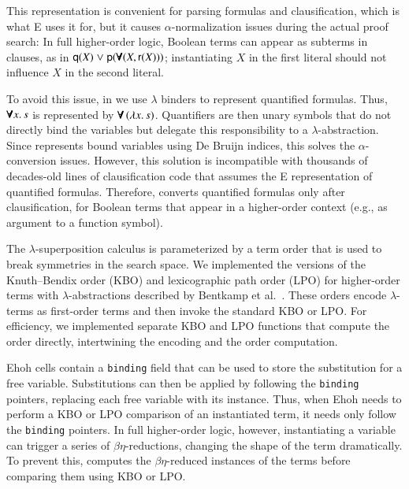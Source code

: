 This representation is convenient for parsing formulas and clausification, which
is what E uses it for, but it
causes $\alpha$-normalization issues during the actual proof search: In
full higher-order logic, Boolean terms can appear as subterms in clauses, as in
$\mathsf{q}(X) \mathrel\lor \mathsf{p}(\pmb{\forall}(X, \mathsf{r}(X)))$;
instantiating $X$ in the first literal should not influence $X$ in the second
literal.

To avoid this issue, in \ehohii{} we use $\lambda$ binders to represent quantified formulas.
Thus, $\pmb{\forall} x. \, s$ is represented by $\pmb{\forall} \, (\lambda x. \, s)$.
Quantifiers are then unary symbols that do not directly bind
the variables but delegate this responsibility to a $\lambda$-abstraction.
%
Since \ehohii{} represents bound variables using De Bruijn indices, this solves the
$\alpha$-conversion issues. However, this solution is incompatible with
thousands of decades-old lines of clausification code that assumes the E
representation of
quantified formulas. Therefore, \ehohii{} converts quantified
formulas only after clausification, for Boolean terms that appear in a
higher-order context (e.g., as argument to a function symbol).

The $\lambda$-superposition calculus is parameterized by a term order that is
used to break symmetries in the search space.
We implemented the versions of the Knuth--Bendix order (KBO) and lexicographic
path order (LPO) for higher-order terms with $\lambda$-abstractions described by
Bentkamp et al.~\cite{bbtv-21-full-ho-sup}. These orders
encode $\lambda$-terms as first-order terms and then invoke the standard KBO or
LPO. %
For efficiency, we implemented separate KBO and
LPO functions that compute the order directly, intertwining the encoding and
the order computation.

Ehoh cells contain a \verb|binding| field that can be used to store the
substitution for a free variable. Substitutions can then be applied by following
the \texttt{binding} pointers, replacing each free variable with its instance.
Thus, when Ehoh needs to perform a KBO or LPO comparison of an instantiated term,
it needs only follow the \texttt{binding} pointers.
In full higher-order logic, however, instantiating a variable can trigger a
series of $\beta\eta$-reductions,
changing the shape of the term dramatically. To prevent this, \ehohii{}
computes the $\beta\eta$-reduced instances of the terms
before comparing them using KBO or LPO.

